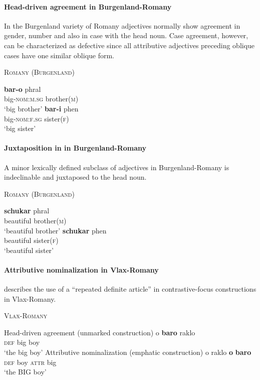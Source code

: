 \paragraph{Head-driven agreement in Burgenland-Romany}

In the Burgenland variety of Romany adjectives normally show agreement in gender, number and also in case with the head noun. Case agreement, however, can be characterized as defective since all attributive adjectives preceding oblique cases have one similar oblique form.
\begin{exe}
\ex \textsc{Romany (Burgenland)} \cite[22–23]{halwachs-etal2002}
\begin{xlist} 
\ex 
\gll	\textbf{bar-o} phral\\
	big-\textsc{nom:m.sg} brother(\textsc{m})\\
\glt	‘big brother’
\ex
\gll	\textbf{bar-i} phen\\
	big-\textsc{nom:f.sg} sister(\textsc{f})\\
\glt	‘big sister’
\end{xlist}
\end{exe}

\paragraph{Juxtaposition in in Burgenland-Romany}
A minor lexically defined subclass of adjectives in Burgenland-Romany is indeclinable and juxtaposed to the head noun.
\begin{exe}
\ex \textsc{Romany (Burgenland)} \citep[22–23]{halwachs-etal2002}
\begin{xlist}
\ex 
\gll	\textbf{schukar} phral\\
	beautiful brother(\textsc{m})\\
\glt	‘beautiful brother’
\ex
\gll	\textbf{schukar} phen\\
	beautiful sister(\textsc{f})\\
\glt	‘beautiful sister’
\end{xlist}
\end{exe}

\paragraph{Attributive nominalization in Vlax-Romany}
\citet{hancock1995} describes the use of a “repeated definite article” in contrastive-focus constructions in Vlax-Romany. 
\begin{exe}
\ex \textsc{Vlax-Romany} \citep[30]{hancock1995}
\begin{xlist}
\ex Head-driven agreement (unmarked construction)
\gll	o \textbf{baro} raklo\\
	\textsc{def}	big	boy\\
\glt ‘the big boy’
\ex Attributive nominalization (emphatic construction)
\gll	o raklo \textbf{o} \textbf{baro}\\
	\textsc{def}	{boy}	\textsc{attr} big\\
\glt	‘the BIG boy’
\end{xlist}
\end{exe}

